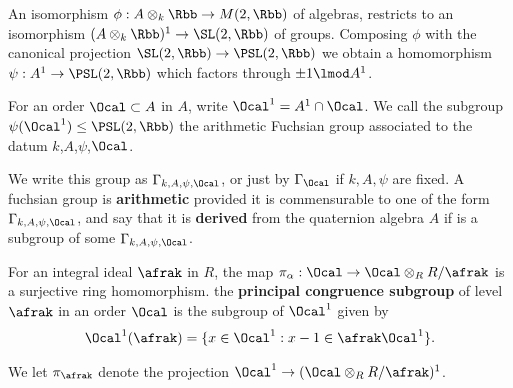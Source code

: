 An isomorphism $\phi : A\otimes_k \Rbb \to M(2,\Rbb)$ of algebras, restricts to an isomorphism $(A\otimes_k \Rbb)^1 \to \SL(2,\Rbb)$ of groups. Composing $\phi$ with the canonical projection $\SL(2,\Rbb)  \to \PSL(2,\Rbb)$ we obtain a homomorphism $\psi : A^1 \to \PSL(2,\Rbb)$ which factors through $\pm 1 \lmod A^1$.

For an order  $\Ocal \subset A$ in $A$, write $\Ocal^1 = A^1 \cap \Ocal$. We call the subgroup $\psi(\Ocal^1)\leq \PSL(2,\Rbb)$ the arithmetic Fuchsian group associated to the datum $k$,$A$,$\psi$,$\Ocal$.

We write this group as $\Gamma_{k,A,\psi,\Ocal}$, or just by $\Gamma_\Ocal$ if $k,A,\psi$ are fixed. A fuchsian group is \textbf{arithmetic} provided it is commensurable to one of the form $\Gamma_{k,A,\psi,\Ocal}$, and say that it is \textbf{derived} from the quaternion algebra $A$ if is a subgroup of some $\Gamma_{k,A,\psi,\Ocal}$.


For an integral ideal $\afrak$ in $R$, the map $\pi_\alpha: \Ocal \to \Ocal \otimes_R R/\afrak$ is a surjective ring homomorphism.
the \textbf{principal congruence subgroup } of level $\afrak$ in an order $\Ocal$ is the subgroup of $\Ocal^1$ given by
\begin{align*}
  \Ocal^1(\afrak) = \{ x \in \Ocal^1 : x - 1 \in \afrak \Ocal^1\}.
\end{align*}

We let $\pi_\afrak$ denote the projection $\Ocal^1 \to (\Ocal \otimes_R R/\afrak)^1$.   %

